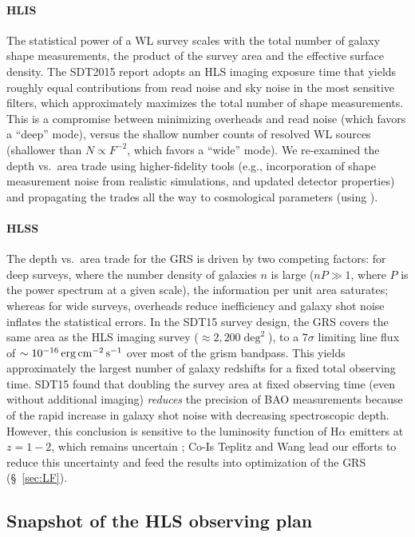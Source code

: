 \paragraph{HLIS} The statistical power of a WL survey scales with the
total number of galaxy shape measurements, the product of the survey area and the effective surface density.
The SDT2015 report adopts an HLS imaging exposure time that yields roughly equal
contributions from read noise and sky noise in the most sensitive
filters, which approximately maximizes the total number of shape
measurements. This is a compromise between minimizing overheads and
read noise (which favors a ``deep'' mode), versus the shallow number
counts of resolved WL sources (shallower than $N\propto F^{-2}$, which
favors a ``wide'' mode). We re-examined the depth vs.\ area trade using
higher-fidelity tools (e.g., incorporation of shape measurement noise from realistic simulations, and updated
detector properties) and propagating the trades all the way to cosmological parameters
(using \CoLi).

\paragraph{HLSS} The depth vs.\ area trade for the GRS is driven by two
competing factors: for deep surveys, where the number density of galaxies $n$ is
large ($nP\gg 1$, where $P$ is the power spectrum at a given scale), the
information per unit area saturates; whereas for wide surveys, overheads reduce
inefficiency and galaxy shot noise inflates the statistical errors. In the SDT15
survey design, the GRS covers the same area as the HLS imaging survey ($\approx
2,200\deg^2$), to a $7\sigma$ limiting line flux of $\sim 10^{-16}
\,{\rm erg}\,{\rm cm}^{-2}\,{\rm s}^{-1}$ over most of the grism bandpass. This yields
approximately the largest number of galaxy redshifts for a fixed total observing
time. SDT15 found that doubling the survey area at fixed observing time (even
without additional imaging) {\it reduces} the precision of BAO measurements
because of the rapid increase in galaxy shot noise with decreasing spectroscopic
depth. However, this conclusion is sensitive to the luminosity function of
H$\alpha$ emitters at $z=1-2$, which remains uncertain
\cite{Mehta:2015,Pozzetti:2016}; Co-Is Teplitz and Wang lead our efforts to
reduce this uncertainty and feed the results into optimization of the GRS
(\S~\ref{sec:LF}).


\subsection{Snapshot of the HLS observing plan}
\label{ss:snapshot}


